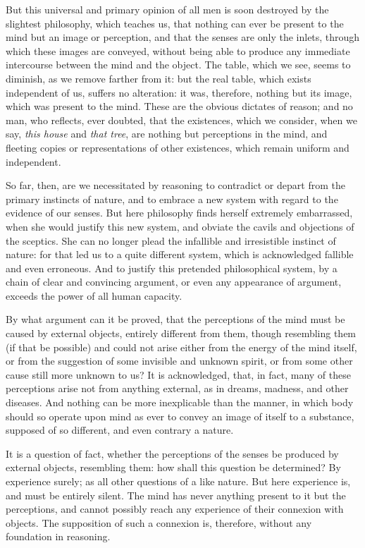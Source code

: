 \documentclass[]{article}
\begin{document}
\begin{sectionbody}
\humeparagraph  But this universal and primary opinion of all men is soon destroyed by the slightest philosophy, which teaches us, that nothing can ever be present to the mind but an image or perception, and that the senses are only the inlets, through which these images are conveyed, without being able to produce any immediate intercourse between the mind and the object. The table, which we see, seems to diminish, as we remove farther from it: but the real table, which exists independent of us, suffers no alteration: it was, therefore, nothing but its image, which was present to the mind. These are the obvious dictates of reason; and no man, who reflects, ever doubted, that the existences, which we consider, when we say, \emph{this house} and \emph{that tree}, are nothing but perceptions in the mind, and fleeting copies or representations of other existences, which remain uniform and independent.

\humeparagraph  So far, then, are we necessitated by reasoning to contradict or depart from the primary instincts of nature, and to embrace a new system with regard to the evidence of our senses. But here philosophy finds herself extremely embarrassed, when she would justify this new system, and obviate the cavils and objections of the sceptics. She can no longer plead the infallible and irresistible instinct of nature: for that led us to a quite different system, which is acknowledged fallible and even erroneous. And to justify this pretended philosophical system, by a chain of clear and convincing argument, or even any appearance of argument, exceeds the power of all human capacity.

\humeparagraph  By what argument can it be proved, that the perceptions of the mind must be caused by external objects, entirely different from them, though resembling them (if that be possible) and could not arise either from the energy of the mind itself, or from the suggestion of some invisible and unknown spirit, or from some other cause still more unknown to us? It is acknowledged, that, in fact, many of these perceptions arise not from anything external, as in dreams, madness, and other diseases. And nothing can be more inexplicable than the manner, in which body should so operate upon mind as ever to convey an image of itself to a substance, supposed of so different, and even contrary a nature.

\humeparagraph  It is a question of fact, whether the perceptions of the senses be produced by external objects, resembling them: how shall this question be determined? By experience surely; as all other questions of a like nature. But here experience is, and must be entirely silent. The mind has never anything present to it but the perceptions, and cannot possibly reach any experience of their connexion with objects. The supposition of such a connexion is, therefore, without any foundation in reasoning.


\end{sectionbody}
\end{document}
